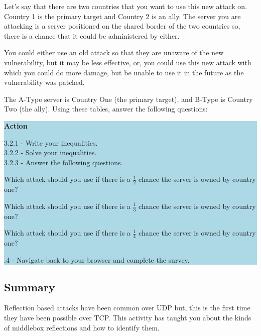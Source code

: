 \documentclass[letterpaper,12pt]{report}
\begin{document}
Let's say that there are two countries that you want to use this new attack on. Country 1 is the primary target and Country 2 is an ally. The server you are attacking is a server positioned on the shared border of the two countries so, there is a chance that it could be administered by either.

You could either use an old attack so that they are unaware of the new vulnerability, but it may be less effective, or, you could use this new attack with which you could do more damage, but be unable to use it in the future as the vulnerability was patched.

The A-Type server is Country One (the primary target), and B-Type is Country Two (the ally). Using these tables, answer the following questions:

\colorbox{lightblue}{%
\parbox{\dimexpr\linewidth-2\fboxsep}{%
\textbf{Action}

3.2.1 - Write your inequalities. \\
3.2.2 - Solve your inequalities. \\
3.2.3 - Answer the following questions. \\
\begin{mdframed}[backgroundcolor=black!10,style=code,nobreak=true,align=center,userdefinedwidth=14cm]
    Which attack should you use if there is a $\frac{1}{2}$ chance the server is owned by country one?

    Which attack should you use if there is a $\frac{1}{3}$ chance the server is owned by country one?

    Which attack should you use if there is a $\frac{1}{4}$ chance the server is owned by country one?
\end{mdframed}
.4 - Navigate back to your browser and complete the survey.
    }%
}%

\bigskip




\subsection*{Summary}\label{sec:Sumarry}

Reflection based attacks have been common over UDP but, this is the first time they have been possible over TCP. This activity has taught you about the kinds of middlebox reflections and how to identify them.
\end{document}
